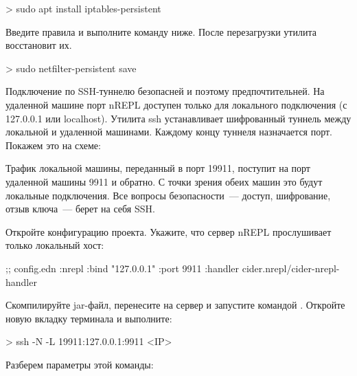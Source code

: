 \begin{english}
  \begin{bash}
> sudo apt install iptables-persistent
  \end{bash}
\end{english}

Введите правила и выполните команду ниже. После перезагрузки утилита восстановит их.

\begin{english}
  \begin{bash}
> sudo netfilter-persistent save
  \end{bash}
\end{english}

Подключение по SSH-туннелю безопасней и поэтому предпочтительней. На удаленной машине порт nREPL доступен только для локального подключения (с 127.0.0.1 или localhost). Утилита ssh устанавливает шифрованный туннель между локальной и удаленной машинами. Каждому концу туннеля назначается порт. Покажем это на схеме:

\begin{figure}[H]
  \centering
  
  \label{fig:chart-repl-02}
\end{figure}

Трафик локальной машины, переданный в порт 19911, поступит на порт удаленной машины 9911 и обратно. С точки зрения обеих машин это будут локальные подключения. Все вопросы безопасности~--- доступ, шифрование, отзыв ключа~--- берет на себя SSH.

Откройте конфигурацию проекта. Укажите, что сервер nREPL прослушивает только локальный хост:

\begin{english}
  \begin{clojure}
;; config.edn
{:nrepl
  {:bind "127.0.0.1"
   :port 9911
   :handler cider.nrepl/cider-nrepl-handler}}
  \end{clojure}
\end{english}

Скомпилируйте jar-файл, перенесите на сервер и запустите командой . Откройте новую вкладку терминала и выполните:

\begin{english}
  \begin{bash}
> ssh -N -L 19911:127.0.0.1:9911 <IP>
  \end{bash}
\end{english}

Разберем параметры этой команды:

